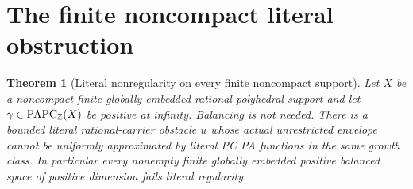 \documentclass[11pt]{article}
\newtheorem{theorem}{Theorem}[section]
\theoremstyle{definition}\newtheorem{definition}[theorem]{Definition}
\theoremstyle{remark}\newtheorem{remark}[theorem]{Remark}
\newcommand{\PAPC}{\mathrm{PAPC}}\newcommand{\epi}{\operatorname{epi}}
\begin{document}
\section{The finite noncompact literal obstruction}
\begin{theorem}[Literal nonregularity on every finite noncompact support]\label{thm:literal}
Let $X$ be a noncompact finite globally embedded rational polyhedral support and let $\gamma\in\PAPC_\Z(X)$ be positive at infinity. Balancing is not needed. There is a bounded literal rational-carrier obstacle $u$ whose actual unrestricted envelope cannot be uniformly approximated by literal PC PA functions in the same growth class. In particular every nonempty finite globally embedded positive balanced space of positive dimension fails literal regularity.
\end{theorem}
\end{document}
